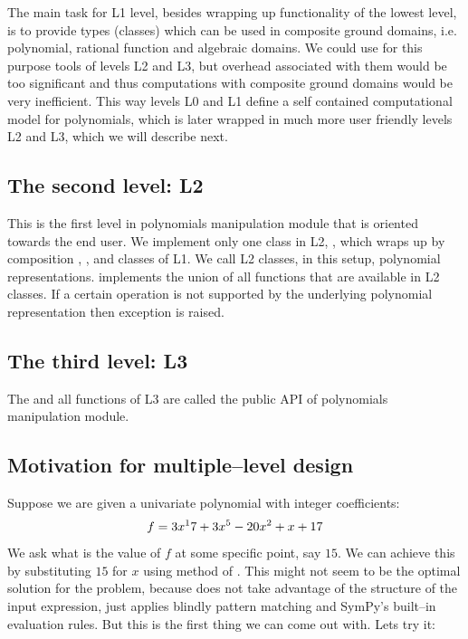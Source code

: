 The main task for L1 level, besides wrapping up functionality of the lowest level, is to
provide types (classes) which can be used in composite ground domains, i.e. polynomial,
rational function and algebraic domains. We could use for this purpose tools of levels L2
and L3, but overhead associated with them would be too significant and thus computations
with composite ground domains would be very inefficient. This way levels L0 and L1 define
a self contained computational model for polynomials, which is later wrapped in much more
user friendly levels L2 and L3, which we will describe next.


\subsection{The second level: L2}

This is the first level in polynomials manipulation module that is oriented towards the end
user. We implement only one class in L2, , which wraps up by composition ,
,  and  classes of L1. We call L2 classes, in this setup, polynomial
representations.  implements the union of all functions that are available in L2
classes. If a certain operation is not supported by the underlying polynomial representation
then  exception is raised.


\subsection{The third level: L3}

The  and all functions of L3 are called the public API of polynomials manipulation
module.


\subsection{Motivation for multiple--level design}

Suppose we are given a univariate polynomial with integer coefficients:
\begin{gather}
\begin{split}f = 3 x^17 + 3 x^5 - 20 x^2 + x + 17\end{split}\notag
\end{gather}
We ask what is the value of $f$ at some specific point, say $15$. We can achieve this by
substituting $15$ for $x$ using  method of . This might not seem to
be the optimal solution for the problem, because  does not take advantage of
the structure of the input expression, just applies blindly pattern matching and SymPy's
built--in evaluation rules. But this is the first thing we can come out with. Lets try it:

